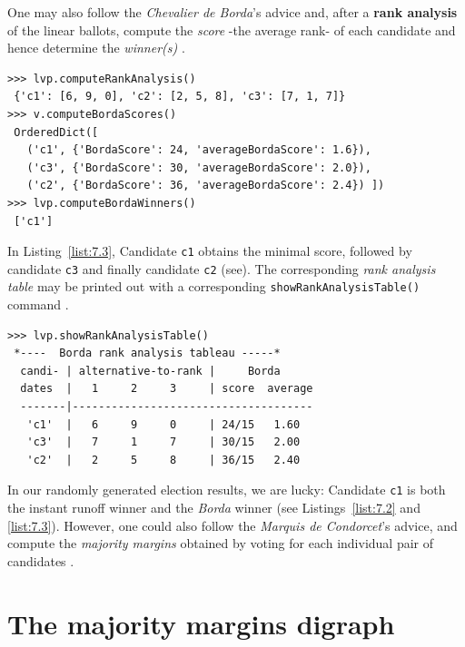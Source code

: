One may also follow the \emph{Chevalier de Borda}'s advice and, after a \textbf{rank analysis} of the linear ballots, compute the \Borda \emph{score} -the average rank- of each candidate and hence determine the \Borda \emph{winner(s)} \citep{BOR-1781}.
\begin{lstlisting}[caption={Example of \Borda rank scores},label=list:7.3]
>>> lvp.computeRankAnalysis()
 {'c1': [6, 9, 0], 'c2': [2, 5, 8], 'c3': [7, 1, 7]}
>>> v.computeBordaScores()
 OrderedDict([
   ('c1', {'BordaScore': 24, 'averageBordaScore': 1.6}),
   ('c3', {'BordaScore': 30, 'averageBordaScore': 2.0}),
   ('c2', {'BordaScore': 36, 'averageBordaScore': 2.4}) ])
>>> lvp.computeBordaWinners()
 ['c1']
\end{lstlisting}
In  Listing~\vref{list:7.3}, Candidate \texttt{c1} obtains the minimal \Borda score, followed by candidate \texttt{c3} and finally candidate \texttt{c2} (see). The corresponding \Borda \emph{rank analysis table} may be printed out with a corresponding \texttt{showRankAnalysisTable()} command .
\begin{lstlisting}[caption={Rank analysis example},label=list:7.4]
>>> lvp.showRankAnalysisTable()
 *----  Borda rank analysis tableau -----*
  candi- | alternative-to-rank |     Borda
  dates  |   1     2     3     | score  average
  -------|-------------------------------------
   'c1'  |   6     9     0     | 24/15   1.60
   'c3'  |   7     1     7     | 30/15   2.00
   'c2'  |   2     5     8     | 36/15   2.40
 \end{lstlisting}

In our randomly generated election results, we are lucky: Candidate \texttt{c1} is both the instant runoff winner and the \emph{Borda} winner (see Listings~\vref{list:7.2} and \vref{list:7.3}). However, one could also follow the \emph{Marquis de Condorcet}'s advice, and compute the \emph{majority margins} obtained by voting for each individual pair of candidates \citep{CON-1784}.

\section{The majority margins digraph}
\label{sec:7.3}

